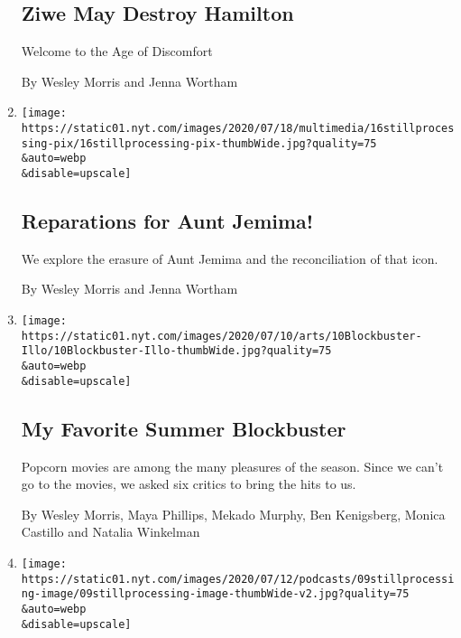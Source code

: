 \begin{enumerate}
  \hypertarget{ziwe-may-destroy-hamilton}{%
  \subsection{Ziwe May Destroy
  Hamilton}\label{ziwe-may-destroy-hamilton}}

  Welcome to the Age of Discomfort

  By Wesley Morris and Jenna Wortham
\item
  \href{/2020/07/16/podcasts/reparations-for-aunt-jemima.html}{}

  \texttt{[image: https://static01.nyt.com/images/2020/07/18/multimedia/16stillprocessing-pix/16stillprocessing-pix-thumbWide.jpg?quality=75\\\&auto=webp\\\&disable=upscale]}

  \hypertarget{reparations-for-aunt-jemima}{%
  \subsection{Reparations for Aunt
  Jemima!}\label{reparations-for-aunt-jemima}}

  We explore the erasure of Aunt Jemima and the reconciliation of that
  icon.

  By Wesley Morris and Jenna Wortham
\item
  \href{/2020/07/09/movies/summer-movies-blockbusters.html}{}

  \texttt{[image: https://static01.nyt.com/images/2020/07/10/arts/10Blockbuster-Illo/10Blockbuster-Illo-thumbWide.jpg?quality=75\\\&auto=webp\\\&disable=upscale]}

  \hypertarget{my-favorite-summer-blockbuster}{%
  \subsection{My Favorite Summer
  Blockbuster}\label{my-favorite-summer-blockbuster}}

  Popcorn movies are among the many pleasures of the season. Since we
  can't go to the movies, we asked six critics to bring the hits to us.

  By Wesley Morris, Maya Phillips, Mekado Murphy, Ben Kenigsberg, Monica
  Castillo and Natalia Winkelman
\item
  \href{/2020/07/09/podcasts/still-processing-black-lives-matter.html}{}

  \texttt{[image: https://static01.nyt.com/images/2020/07/12/podcasts/09stillprocessing-image/09stillprocessing-image-thumbWide-v2.jpg?quality=75\\\&auto=webp\\\&disable=upscale]}


\end{enumerate}
